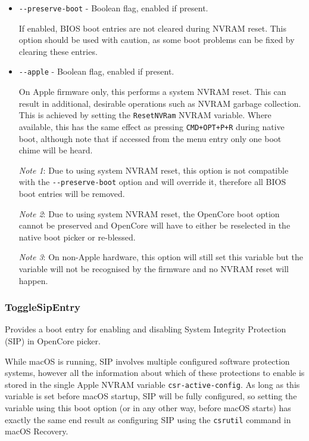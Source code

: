 \documentclass[]{article}
\begin{document}
\begin{itemize}
  \item \texttt{-{}-preserve-boot} - Boolean flag, enabled if present. \medskip

  If enabled, BIOS boot entries are not cleared during NVRAM reset. This option should
  be used with caution, as some boot problems can be fixed by clearing these entries. \medskip

  \item \texttt{-{}-apple} - Boolean flag, enabled if present. \medskip

  On Apple firmware only, this performs a system NVRAM reset. This can result in
  additional, desirable operations such as NVRAM garbage collection. This is achieved by
  setting the \texttt{ResetNVRam} NVRAM variable.
  Where available, this has the same effect as pressing \texttt{CMD+OPT+P+R} during native boot,
  although note that if accessed from the menu entry only one boot chime will be heard. \medskip

  \emph{Note 1}: Due to using system NVRAM reset, this option is not compatible with the \texttt{-{}-preserve-boot}
  option and will override it, therefore all BIOS boot entries will be removed. \medskip

  \emph{Note 2}: Due to using system NVRAM reset, the OpenCore boot option
  cannot be preserved and OpenCore will have to either be reselected in the native boot picker or
  re-blessed. \medskip

  \emph{Note 3}: On non-Apple hardware, this option will still set this variable but the
  variable will not be recognised by the firmware and no NVRAM reset will happen. \medskip
\end{itemize}

\subsubsection{ToggleSipEntry}\label{uefitogglesip}

Provides a boot entry for enabling and disabling System Integrity Protection (SIP) in OpenCore picker.

While macOS is running, SIP involves multiple configured software protection systems, however
all the information about which of these protections to enable is stored in the single Apple NVRAM variable
\texttt{csr-active-config}. As long as this variable is set before macOS startup,
SIP will be fully configured, so setting the variable using this boot option
(or in any other way, before macOS starts) has exactly the same end result as configuring SIP using the
\texttt{csrutil} command in macOS Recovery.
\end{document}
